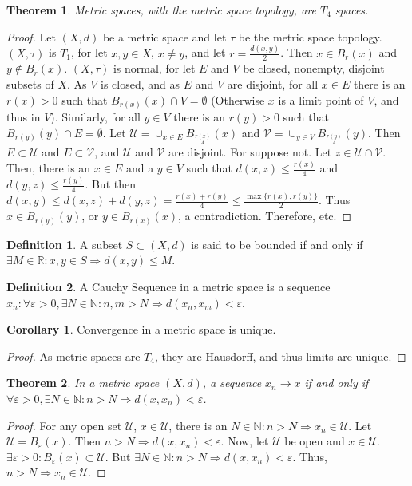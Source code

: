 \documentclass[oneside]{book}
\newtheorem{theorem}{Theorem}[section]
\theoremstyle{definition}
\newtheorem{definition}{Definition}[section]
\newtheorem{corollary}{Corollary}[section]
\begin{document}
\begin{theorem}
Metric spaces, with the metric space topology, are $T_4$ spaces.
\end{theorem}
\begin{proof}
Let $(X,d)$ be a metric space and let $\tau$ be the metric space topology. $(X,\tau)$ is $T_1$, for let $x,y\in X$, $x\ne y$, and let $r= \frac{d(x,y)}{2}$. Then $x\in B_{r}(x)$ and $y\notin B_{r}(x)$. $(X,\tau)$ is normal, for let $E$ and $V$ be closed, nonempty, disjoint subsets of $X$. As $V$ is closed, and as $E$ and $V$ are disjoint, for all $x\in E$ there is an $r(x)>0$ such that $B_{r(x)}(x)\cap V = \emptyset$ (Otherwise $x$ is a limit point of $V$, and thus in $V$). Similarly, for all $y\in V$ there is an $r(y)>0$ such that $B_{r(y)}(y)\cap E = \emptyset$. Let $\mathcal{U} = \cup_{x\in E}B_{\frac{r(x)}{4}}(x)$ and $\mathcal{V} = \cup_{y\in V}B_{\frac{r(y)}{4}}(y)$. Then $E\subset \mathcal{U}$ and $E\subset \mathcal{V}$, and $\mathcal{U}$ and $\mathcal{V}$ are disjoint. For suppose not. Let $z\in \mathcal{U}\cap \mathcal{V}$. Then, there is an $x\in E$ and a $y\in V$ such that $d(x,z)\leq \frac{r(x)}{4}$ and $d(y,z)\leq \frac{r(y)}{4}$. But then $d(x,y) \leq d(x,z)+d(y,z) = \frac{r(x)+r(y)}{4} \leq \frac{\max\{r(x),r(y)\}}{2}$. Thus $x\in B_{r(y)}(y)$, or $y\in B_{r(x)}(x)$, a contradiction. Therefore, etc.
\end{proof}

\begin{definition}
A subset $S\subset (X,d)$ is said to be bounded if and only if $\exists M\in \mathbb{R}:x,y\in S\Rightarrow d(x,y)\leq M$.
\end{definition}

\begin{definition}
A Cauchy Sequence in a metric space is a sequence $x_n:\forall \varepsilon>0,\exists N\in \mathbb{N}:n,m>N\Rightarrow d(x_n,x_m)<\varepsilon$.
\end{definition}

\begin{corollary}
Convergence in a metric space is unique.
\end{corollary}
\begin{proof}
As metric spaces are $T_4$, they are Hausdorff, and thus limits are unique.
\end{proof}

\begin{theorem}
In a metric space $(X,d)$, a sequence $x_n\rightarrow x$ if and only if $\forall\varepsilon>0,\exists N\in \mathbb{N}:n>N\Rightarrow d(x,x_n)<\varepsilon$.
\end{theorem}
\begin{proof}
For any open set $\mathcal{U}$, $x\in \mathcal{U}$, there is an $N\in \mathbb{N}:n>N\Rightarrow x_n \in \mathcal{U}$. Let $\mathcal{U}=B_{\varepsilon}(x)$. Then $n>N\Rightarrow d(x,x_n)<\varepsilon$. Now, let $\mathcal{U}$ be open and $x\in \mathcal{U}$. $\exists\varepsilon>0:B_{\varepsilon}(x)\subset \mathcal{U}$. But $\exists N\in \mathbb{N}:n>N\Rightarrow d(x,x_n)<\varepsilon$. Thus, $n>N\Rightarrow x_n\in \mathcal{U}$.
\end{proof}
\end{document}
